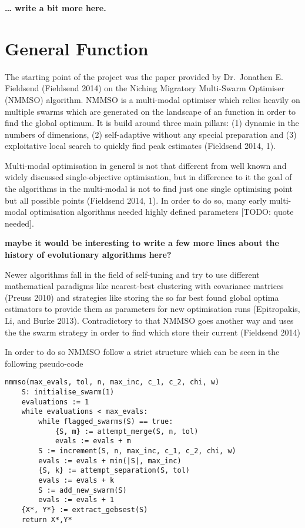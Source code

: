 \documentclass[12pt,a4paper]{article}
\begin{document}
\textbf{\ldots{} write a bit more here.}

\section{General Function}\label{general-function}

The starting point of the project was the paper provided by Dr.~Jonathen
E. Fieldsend (Fieldsend 2014) on the Niching Migratory Multi-Swarm
Optimiser (NMMSO) algorithm. NMMSO is a multi-modal optimiser which
relies heavily on multiple swarms which are generated on the landscape
of an function in order to find the global optimum. It is build around
three main pillars: (1) dynamic in the numbers of dimensions, (2)
self-adaptive without any special preparation and (3) exploitative local
search to quickly find peak estimates (Fieldsend 2014, 1).

Multi-modal optimisation in general is not that different from well
known and widely discussed single-objective optimisation, but in
difference to it the goal of the algorithms in the multi-modal is not to
find just one single optimising point but all possible points (Fieldsend
2014, 1). In order to do so, many early multi-modal optimisation
algorithms needed highly defined parameters {[}TODO: quote needed{]}.

\textbf{maybe it would be interesting to write a few more lines about
the history of evolutionary algorithms here?}

Newer algorithms fall in the field of self-tuning and try to use
different mathematical paradigms like nearest-best clustering with
covariance matrices (Preuss 2010) and strategies like storing the so far
best found global optima estimators to provide them as parameters for
new optimisation runs (Epitropakis, Li, and Burke 2013). Contradictory
to that NMMSO goes another way and uses the the swarm strategy in order
to find which store their current (Fieldsend 2014)

In order to do so NMMSO follow a strict structure which can be seen in
the following pseudo-code

\begin{verbatim}
nmmso(max_evals, tol, n, max_inc, c_1, c_2, chi, w)
    S: initialise_swarm(1)
    evaluations := 1
    while evaluations < max_evals:
        while flagged_swarms(S) == true:
            {S, m} := attempt_merge(S, n, tol)
            evals := evals + m
        S := increment(S, n, max_inc, c_1, c_2, chi, w)
        evals := evals + min(|S|, max_inc)
        {S, k} := attempt_separation(S, tol)
        evals := evals + k
        S := add_new_swarm(S)
        evals := evals + 1
    {X*, Y*} := extract_gebsest(S)
    return X*,Y*
\end{verbatim}
\end{document}
